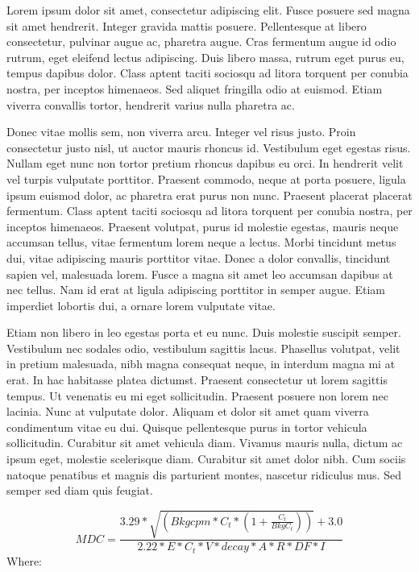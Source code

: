 \documentclass[double,12pt]{beavtex}
\begin{document}
Lorem ipsum dolor sit amet, consectetur adipiscing elit. Fusce posuere sed magna sit amet hendrerit. Integer gravida mattis posuere. Pellentesque at libero consectetur, pulvinar augue ac, pharetra augue. Cras fermentum augue id odio rutrum, eget eleifend lectus adipiscing. Duis libero massa, rutrum eget purus eu, tempus dapibus dolor. Class aptent taciti sociosqu ad litora torquent per conubia nostra, per inceptos himenaeos. Sed aliquet fringilla odio at euismod. Etiam viverra convallis tortor, hendrerit varius nulla pharetra ac. 

Donec vitae mollis sem, non viverra arcu. Integer vel risus justo. Proin consectetur justo nisl, ut auctor mauris rhoncus id. Vestibulum eget egestas risus. Nullam eget nunc non tortor pretium rhoncus dapibus eu orci. In hendrerit velit vel turpis vulputate porttitor. Praesent commodo, neque at porta posuere, ligula ipsum euismod dolor, ac pharetra erat purus non nunc. Praesent placerat placerat fermentum. Class aptent taciti sociosqu ad litora torquent per conubia nostra, per inceptos himenaeos. Praesent volutpat, purus id molestie egestas, mauris neque accumsan tellus, vitae fermentum lorem neque a lectus. Morbi tincidunt metus dui, vitae adipiscing mauris porttitor vitae. Donec a dolor convallis, tincidunt sapien vel, malesuada lorem. Fusce a magna sit amet leo accumsan dapibus at nec tellus. Nam id erat at ligula adipiscing porttitor in semper augue. Etiam imperdiet lobortis dui, a ornare lorem vulputate vitae. 

Etiam non libero in leo egestas porta et eu nunc. Duis molestie suscipit semper. Vestibulum nec sodales odio, vestibulum sagittis lacus. Phasellus volutpat, velit in pretium malesuada, nibh magna consequat neque, in interdum magna mi at erat. In hac habitasse platea dictumst. Praesent consectetur ut lorem sagittis tempus. Ut venenatis eu mi eget sollicitudin. Praesent posuere non lorem nec lacinia. Nunc at vulputate dolor. Aliquam et dolor sit amet quam viverra condimentum vitae eu dui. Quisque pellentesque purus in tortor vehicula sollicitudin. Curabitur sit amet vehicula diam. Vivamus mauris nulla, dictum ac ipsum eget, molestie scelerisque diam. Curabitur sit amet dolor nibh. Cum sociis natoque penatibus et magnis dis parturient montes, nascetur ridiculus mus. Sed semper sed diam quis feugiat. 


\begin{equation}
MDC=\frac{3.29*\sqrt{(Bkgcpm*C_{t}*(1+\frac{C_{t}}{BkgC_{t}}))}+3.0}{2.22*E*C_{t}*V*decay*A*R*DF*I}
\label{eq:mdc}
\end{equation}
Where:
\end{document}
